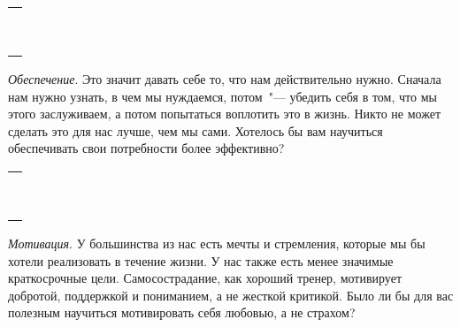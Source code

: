\setlength{\extrarowheight}{2mm}
\begin{tabularx}{\textwidth}{X}
	\\
	\arrayrulecolor{gray}\hline\\
	\hline\\
	\hline\\
	\hline\\
	\hline\\
	\hline\\
	\hline\\
	\hline\\
	\hline\\
	\hline\\
\end{tabularx}
\setlength{\extrarowheight}{0mm}

\begin{itemize}
	\itemyinyang \textit{Обеспечение}. Это значит давать себе то, что нам действительно нужно. Сначала нам нужно узнать, в чем мы нуждаемся, потом~"--- убедить себя в том, что мы этого заслуживаем, а потом попытаться воплотить это в жизнь. Никто не может сделать это для нас лучше, чем мы сами. Хотелось бы вам научиться обеспечивать свои потребности более эффективно?
\end{itemize}

\setlength{\extrarowheight}{2mm}
\begin{tabularx}{\textwidth}{X}
	\\
	\arrayrulecolor{gray}\hline\\
	\hline\\
	\hline\\
	\hline\\
	\hline\\
	\hline\\
	\hline\\
	\hline\\
	\hline\\
	\hline\\
\end{tabularx}
\setlength{\extrarowheight}{0mm}

\begin{itemize}
	\itemyinyang \textit{Мотивация}. У большинства из нас есть мечты и стремления, которые мы бы хотели реализовать в течение жизни. У нас также есть менее значимые краткосрочные цели. Самосострадание, как хороший тренер, мотивирует добротой, поддержкой и пониманием, а не жесткой критикой. Было ли бы для вас полезным научиться мотивировать себя любовью, а не страхом? 
\end{itemize}

